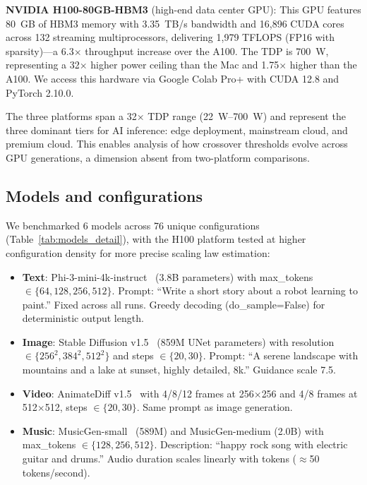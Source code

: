 \documentclass[preprint,12pt]{elsarticle}
\begin{document}
\textbf{NVIDIA H100-80GB-HBM3} (high-end data center GPU): This GPU features 80~GB of HBM3 memory with 3.35~TB/s bandwidth and 16,896 CUDA cores across 132 streaming multiprocessors, delivering 1,979 TFLOPS (FP16 with sparsity)---a 6.3$\times$ throughput increase over the A100. The TDP is 700~W, representing a 32$\times$ higher power ceiling than the Mac and 1.75$\times$ higher than the A100. We access this hardware via Google Colab Pro+ with CUDA 12.8 and PyTorch 2.10.0.

The three platforms span a 32$\times$ TDP range (22~W--700~W) and represent the three dominant tiers for AI inference: edge deployment, mainstream cloud, and premium cloud. This enables analysis of how crossover thresholds evolve across GPU generations, a dimension absent from two-platform comparisons.

\subsection{Models and configurations}

We benchmarked 6 models across 76 unique configurations (Table~\ref{tab:models_detail}), with the H100 platform tested at higher configuration density for more precise scaling law estimation:

\begin{itemize}[leftmargin=*]
\item \textbf{Text}: Phi-3-mini-4k-instruct~\cite{abdin2024phi3} (3.8B parameters) with max\_tokens $\in \{64, 128, 256, 512\}$. Prompt: ``Write a short story about a robot learning to paint.'' Fixed across all runs. Greedy decoding (do\_sample=False) for deterministic output length.
\item \textbf{Image}: Stable Diffusion v1.5~\cite{rombach2022high} (859M UNet parameters) with resolution $\in \{256^2, 384^2, 512^2\}$ and steps $\in \{20, 30\}$. Prompt: ``A serene landscape with mountains and a lake at sunset, highly detailed, 8k.'' Guidance scale 7.5.
\item \textbf{Video}: AnimateDiff v1.5~\cite{guo2024animatediff} with 4/8/12 frames at 256$\times$256 and 4/8 frames at 512$\times$512, steps $\in \{20, 30\}$. Same prompt as image generation.
\item \textbf{Music}: MusicGen-small~\cite{copet2024musicgen} (589M) and MusicGen-medium (2.0B) with max\_tokens $\in \{128, 256, 512\}$. Description: ``happy rock song with electric guitar and drums.'' Audio duration scales linearly with tokens ($\approx$50 tokens/second).
\end{itemize}
\end{document}
